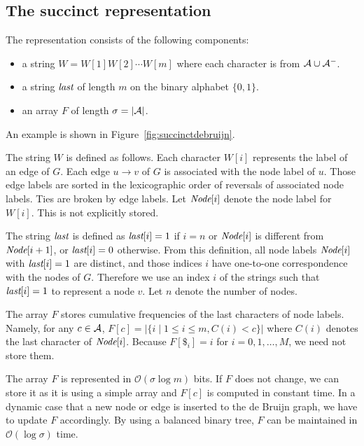 \documentclass{llncs}
\newcommand{\Order}{\mathcal{O}}
\begin{document}
\subsection{The succinct representation}

The representation consists of the following components:
\begin{itemize}
\item a string $W = W[1] W[2] \cdots W[m]$ where each character is from ${\cal A} \cup {\cal A}^-$.
\item a string ${\textit{last}}$ of length $m$ on the binary alphabet $\{0,1\}$.
\item an array $F$ of length $\sigma = |{\cal A}|$.
\end{itemize}
An example is shown in Figure~\ref{fig:succinctdebruijn}.

The string $W$ is defined as follows.
Each character $W[i]$ represents the label of an edge of $G$.
Each edge $u \rightarrow v$ of $G$ is associated with the node label of $u$.
Those edge labels are sorted in the lexicographic order of reversals of associated node labels.
Ties are broken by edge labels.
Let ${\textit{Node}}[i]$ denote the node label for $W[i]$.  This is not explicitly stored.

The string ${\textit{last}}$ is defined as
${\textit{last}}[i] = 1$ if $i = n$ or ${\textit{Node}}[i]$ is different from ${\textit{Node}}[i+1]$,
or ${\textit{last}}[i] = 0$ otherwise.  From this definition,
all node labels ${\textit{Node}}[i]$ with ${\textit{last}}[i] = 1$ are distinct, and
those indices $i$ have one-to-one correspondence with the nodes of $G$.
Therefore we use an index $i$ of the strings such that ${\textit{last}}[i] = 1$
to represent a node $v$.  
Let $n$ denote the number of nodes.

The array $F$ stores cumulative frequencies of the last characters of node labels.
Namely, for any $c \in {\cal A}$, 
$F[c] = |\{i \mid 1 \le i \le m, C(i) < c  \}|$
where $C(i)$ denotes the last character of ${\textit{Node}}[i]$.
Because $F[\$_i] = i$ for $i = 0,1,\ldots,M$, we need not store them.

The array $F$ is represented in $\Order(\sigma \log m)$ bits.
If $F$ does not change, we can store it as it is using a simple array and $F[c]$ is computed
in constant time.
In a dynamic case that a new node or edge is inserted to the de Bruijn graph,
we have to update $F$ accordingly.  By using a balanced binary tree, $F$ can be maintained
in $\Order(\log \sigma)$ time.
\end{document}
